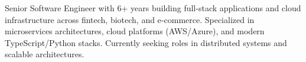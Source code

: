 \vspace{-1.5em}
\vspace{0.5em}
Senior Software Engineer with 6+ years building full-stack applications and cloud infrastructure across fintech, biotech, and e-commerce. Specialized in microservices architectures, cloud platforms (AWS/Azure), and modern TypeScript/Python stacks. Currently seeking roles in distributed systems and scalable architectures.
